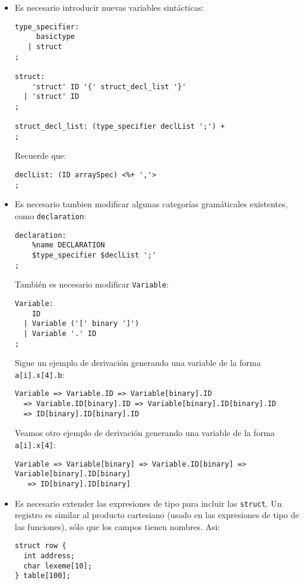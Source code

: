 \begin{itemize}
\item
Es necesario introducir nuevas variables sintácticas:

\begin{verbatim}
type_specifier:
     basictype
   | struct
;

struct: 
    'struct' ID '{' struct_decl_list '}'
  | 'struct' ID 
;

struct_decl_list: (type_specifier declList ';') +
;
\end{verbatim}
Recuerde que:
\begin{verbatim}
declList: (ID arraySpec) <%+ ','> 
;
\end{verbatim}

\item
Es necesario tambien modificar algunas categorías gramáticales existentes, como
\verb|declaration|:
\begin{verbatim}
declaration:
    %name DECLARATION
    $type_specifier $declList ';' 
;
\end{verbatim}
También es necesario modificar \verb|Variable|:
\begin{verbatim}
Variable:
    ID 
  | Variable ('[' binary ']') 
  | Variable '.' ID
;
\end{verbatim}

Sigue un ejemplo de derivación generando una variable de la forma
\verb|a[i].x[4].b|:

\begin{verbatim}
Variable => Variable.ID => Variable[binary].ID 
  => Variable.ID[binary].ID => Variable[binary].ID[binary].ID 
  => ID[binary].ID[binary].ID
\end{verbatim}

Veamos otro ejemplo de derivación generando una variable de la forma
\verb|a[i].x[4]|:

\begin{verbatim}
Variable => Variable[binary] => Variable.ID[binary] => Variable[binary].ID[binary]
   => ID[binary].ID[binary]
\end{verbatim}

\item
Es necesario  extender las expresiones de tipo para incluir las \verb|struct|.
Un registro es similar al producto cartesiano (usado en las expresiones de tipo de las funciones),
sólo que los campos tienen nombres. Asi:

\begin{verbatim}
struct row {
  int address;
  char lexeme[10];
} table[100];
\end{verbatim}


\end{itemize}
